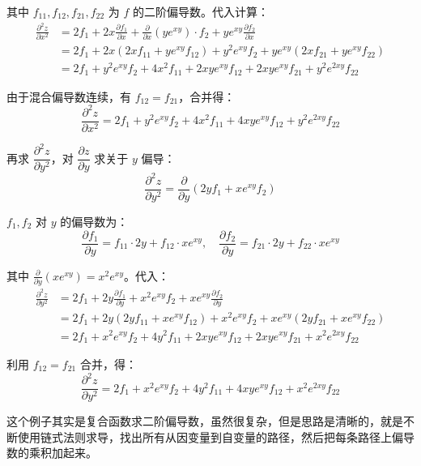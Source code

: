 \begin{myexample}
其中 \(f_{11}, f_{12}, f_{21}, f_{22}\) 为 \(f\) 的二阶偏导数。代入计算：
\begin{align*}
\frac{\partial^2 z}{\partial x^2}
&= 2f_1 + 2x\frac{\partial f_1}{\partial x} + \frac{\partial}{\partial x}(y e^{xy})\cdot f_2 + y e^{xy}\frac{\partial f_2}{\partial x} \\
&= 2f_1 + 2x(2x f_{11} + y e^{xy} f_{12}) + y^2 e^{xy} f_2 + y e^{xy}(2x f_{21} + y e^{xy} f_{22}) \\
&= 2f_1 + y^2 e^{xy} f_2 + 4x^2 f_{11} + 2xy e^{xy} f_{12} + 2xy e^{xy} f_{21} + y^2 e^{2xy} f_{22}
\end{align*}

由于混合偏导数连续，有 \(f_{12} = f_{21}\)，合并得：
\[
\frac{\partial^2 z}{\partial x^2} = 2f_1 + y^2 e^{xy} f_2 + 4x^2 f_{11} + 4xy e^{xy} f_{12} + y^2 e^{2xy} f_{22}
\]

再求 \(\dfrac{\partial^2 z}{\partial y^2}\)，对 \(\dfrac{\partial z}{\partial y}\) 求关于 \(y\) 偏导：
\[
\frac{\partial^2 z}{\partial y^2} = \frac{\partial}{\partial y}(2y f_1 + x e^{xy} f_2)
\]

\(f_1, f_2\) 对 \(y\) 的偏导数为：
\[
\frac{\partial f_1}{\partial y} = f_{11}\cdot 2y + f_{12}\cdot x e^{xy},\quad
\frac{\partial f_2}{\partial y} = f_{21}\cdot 2y + f_{22}\cdot x e^{xy}
\]

其中 \(\frac{\partial}{\partial y}(x e^{xy}) = x^2 e^{xy}\)。代入：
\begin{align*}
\frac{\partial^2 z}{\partial y^2}
&= 2f_1 + 2y\frac{\partial f_1}{\partial y} + x^2 e^{xy} f_2 + x e^{xy}\frac{\partial f_2}{\partial y} \\
&= 2f_1 + 2y(2y f_{11} + x e^{xy} f_{12}) + x^2 e^{xy} f_2 + x e^{xy}(2y f_{21} + x e^{xy} f_{22}) \\
&= 2f_1 + x^2 e^{xy} f_2 + 4y^2 f_{11} + 2xy e^{xy} f_{12} + 2xy e^{xy} f_{21} + x^2 e^{2xy} f_{22}
\end{align*}

利用 \(f_{12} = f_{21}\) 合并，得：
\[
\frac{\partial^2 z}{\partial y^2} = 2f_1 + x^2 e^{xy} f_2 + 4y^2 f_{11} + 4xy e^{xy} f_{12} + x^2 e^{2xy} f_{22}
\]

\end{myexample}

这个例子其实是复合函数求二阶偏导数，虽然很复杂，但是思路是清晰的，就是不断使用链式法则求导，找出所有从因变量到自变量的路径，然后把每条路径上偏导数的乘积加起来。

